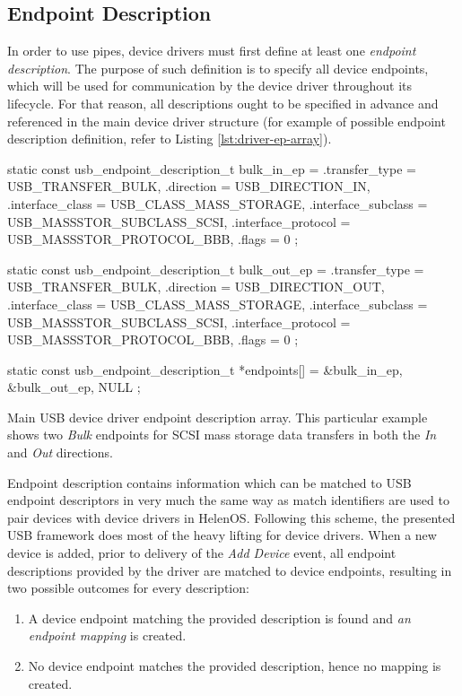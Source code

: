 \subsection{Endpoint Description}

In order to use pipes, device drivers must first define at least one
\textit{endpoint description}. The purpose of such definition is to specify all
device endpoints, which will be used for communication by the device driver
throughout its lifecycle. For that reason, all descriptions ought to be
specified in advance and referenced in the main device driver structure (for
example of possible endpoint description definition, refer to Listing
\ref{lst:driver-ep-array}).

\begin{listing}
	\begin{code}
		static const usb_endpoint_description_t bulk_in_ep = {
			.transfer_type = USB_TRANSFER_BULK,
			.direction = USB_DIRECTION_IN,
			.interface_class = USB_CLASS_MASS_STORAGE,
			.interface_subclass = USB_MASSSTOR_SUBCLASS_SCSI,
			.interface_protocol = USB_MASSSTOR_PROTOCOL_BBB,
			.flags = 0
		};

		static const usb_endpoint_description_t bulk_out_ep = {
			.transfer_type = USB_TRANSFER_BULK,
			.direction = USB_DIRECTION_OUT,
			.interface_class = USB_CLASS_MASS_STORAGE,
			.interface_subclass = USB_MASSSTOR_SUBCLASS_SCSI,
			.interface_protocol = USB_MASSSTOR_PROTOCOL_BBB,
			.flags = 0
		};

		static const usb_endpoint_description_t *endpoints[] = {
			&bulk_in_ep, &bulk_out_ep, NULL
		};
	\end{code}
	\caption[Main USB device driver endpoint description array]{Main USB device
	driver endpoint description array. This particular example shows two
	\textit{Bulk} endpoints for SCSI mass storage data transfers in both the
	\textit{In} and \textit{Out} directions.}
	\label{lst:driver-ep-array}
\end{listing}

Endpoint description contains information which can be matched to USB endpoint
descriptors in very much the same way as match identifiers are used to pair
devices with device drivers in HelenOS. Following this scheme, the presented USB
framework does most of the heavy lifting for device drivers. When a new device
is added, prior to delivery of the \textit{Add Device} event, all endpoint
descriptions provided by the driver are matched to device endpoints, resulting
in two possible outcomes for every description:
%
\begin{enumerate}
	\item A device endpoint matching the provided description is found and
		\textit{an endpoint mapping} is created.
	\item No device endpoint matches the provided description, hence no mapping is
		created.
\end{enumerate}


